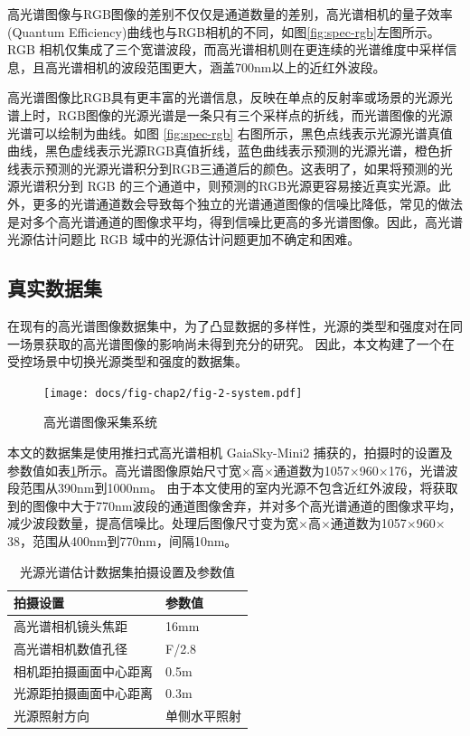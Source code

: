\documentclass[
    type = master, %
    degree = academic,        %
    decl-page,  %
  ]{njuthesis}
\begin{document}
高光谱图像与RGB图像的差别不仅仅是通道数量的差别，高光谱相机的量子效率(Quantum Efficiency)曲线也与RGB相机的不同，如图\ref{fig:spec-rgb}左图所示。RGB 相机仅集成了三个宽谱波段，而高光谱相机则在更连续的光谱维度中采样信息，且高光谱相机的波段范围更大，涵盖700nm以上的近红外波段。

高光谱图像比RGB具有更丰富的光谱信息\cite{hardeberg2002multispectral}，反映在单点的反射率或场景的光源光谱上时，RGB图像的光源光谱是一条只有三个采样点的折线，而光谱图像的光源光谱可以绘制为曲线。如图 \ref{fig:spec-rgb} 右图所示，黑色点线表示光源光谱真值曲线，黑色虚线表示光源RGB真值折线，蓝色曲线表示预测的光源光谱，橙色折线表示预测的光源光谱积分到RGB三通道后的颜色。这表明了，如果将预测的光源光谱积分到 RGB 的三个通道中，则预测的RGB光源更容易接近真实光源。此外，更多的光谱通道数会导致每个独立的光谱通道图像的信噪比降低，常见的做法是对多个高光谱通道的图像求平均，得到信噪比更高的多光谱图像。因此，高光谱光源估计问题比 RGB 域中的光源估计问题更加不确定和困难。

\subsection{真实数据集}

在现有的高光谱图像数据集中，为了凸显数据的多样性，光源的类型和强度对在同一场景获取的高光谱图像的影响尚未得到充分的研究。 因此，本文构建了一个在受控场景中切换光源类型和强度的数据集。 

\begin{figure}[h]
	\centering
	\texttt{[image: docs/fig-chap2/fig-2-system.pdf]}
	\caption{高光谱图像采集系统}
	\label{fig:system}
\end{figure}

本文的数据集是使用推扫式高光谱相机 GaiaSky-Mini2 捕获的，拍摄时的设置及参数值如表\ref{tab:illum capture param}所示。高光谱图像原始尺寸宽$\times$高$\times$通道数为1057$\times$960$\times$176，光谱波段范围从390nm到1000nm。 由于本文使用的室内光源不包含近红外波段，将获取到的图像中大于770nm波段的通道图像舍弃，并对多个高光谱通道的图像求平均，减少波段数量，提高信噪比。处理后图像尺寸变为宽$\times$高$\times$通道数为1057$\times$960$\times$38，范围从400nm到770nm，间隔10nm。 

\begin{table}[h]
\caption{光源光谱估计数据集拍摄设置及参数值 }
\label{tab:illum capture param}
\begin{tabular}{ll}
\hline
拍摄设置   & 参数值     \\ \hline
高光谱相机镜头焦距 & 16mm \\
高光谱相机数值孔径    & F/2.8   \\
相机距拍摄画面中心距离 & 0.5m  \\
光源距拍摄画面中心距离  & 0.3m  \\
光源照射方向   & 单侧水平照射     \\
\hline
\end{tabular}
\end{table}
\end{document}
